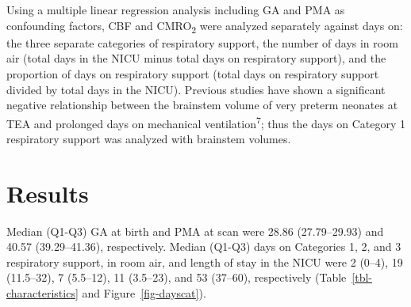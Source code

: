 \documentclass[
  letterpaper,
  DIV=11,
  numbers=noendperiod]{scrartcl}
\begin{document}
Using a multiple linear regression analysis including GA and PMA as
confounding factors, CBF and CMRO\textsubscript{2} were analyzed
separately against days on: the three separate categories of respiratory
support, the number of days in room air (total days in the NICU minus
total days on respiratory support), and the proportion of days on
respiratory support (total days on respiratory support divided by total
days in the NICU). Previous studies have shown a significant negative
relationship between the brainstem volume of very preterm neonates at
TEA and prolonged days on mechanical ventilation\textsuperscript{7};
thus the days on Category 1 respiratory support was analyzed with
brainstem volumes.

\section{Results}\label{results}

Median (Q1-Q3) GA at birth and PMA at scan were 28.86 (27.79--29.93) and
40.57 (39.29--41.36), respectively. Median (Q1-Q3) days on Categories 1,
2, and 3 respiratory support, in room air, and length of stay in the
NICU were 2 (0--4), 19 (11.5--32), 7 (5.5--12), 11 (3.5--23), and 53
(37--60), respectively (Table~\ref{tbl-characteristics} and
Figure~\ref{fig-dayscat}).
\end{document}
